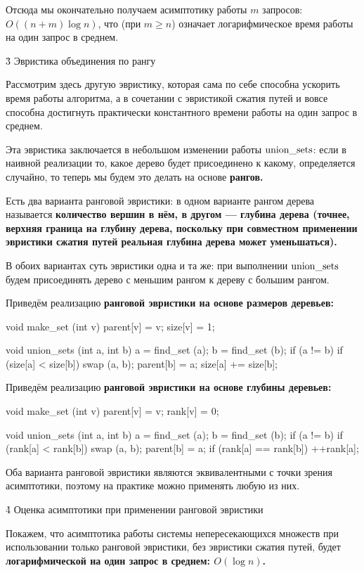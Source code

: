 Отсюда мы окончательно получаем асимптотику работы $m$ запросов: $O((n+m) \log n)$, что (при $m \ge n$) означает логарифмическое время работы на один запрос в среднем.



\h3{ Эвристика объединения по рангу }

Рассмотрим здесь другую эвристику, которая сама по себе способна ускорить время работы алгоритма, а в сочетании с эвристикой сжатия путей и вовсе способна достигнуть практически константного времени работы на один запрос в среднем.

Эта эвристика заключается в небольшом изменении работы ${\rm union\_sets}$: если в наивной реализации то, какое дерево будет присоединено к какому, определяется случайно, то теперь мы будем это делать на основе \bf{рангов}.

Есть два варианта ранговой эвристики: в одном варианте рангом дерева называется \bf{количество вершин} в нём, в другом --- \bf{глубина дерева} (точнее, верхняя граница на глубину дерева, поскольку при совместном применении эвристики сжатия путей реальная глубина дерева может уменьшаться).

В обоих вариантах суть эвристики одна и та же: при выполнении $\rm union\_sets$ будем присоединять дерево с меньшим рангом к дереву с большим рангом.

Приведём реализацию \bf{ранговой эвристики на основе размеров деревьев}:

\code
void make_set (int v) {
	parent[v] = v;
	size[v] = 1;
}

void union_sets (int a, int b) {
	a = find_set (a);
	b = find_set (b);
	if (a != b) {
		if (size[a] < size[b])
			swap (a, b);
		parent[b] = a;
		size[a] += size[b];
	}
}
\endcode

Приведём реализацию \bf{ранговой эвристики на основе глубины деревьев}:

\code
void make_set (int v) {
	parent[v] = v;
	rank[v] = 0;
}

void union_sets (int a, int b) {
	a = find_set (a);
	b = find_set (b);
	if (a != b) {
		if (rank[a] < rank[b])
			swap (a, b);
		parent[b] = a;
		if (rank[a] == rank[b])
			++rank[a];
	}
}
\endcode

Оба варианта ранговой эвристики являются эквивалентными с точки зрения асимптотики, поэтому на практике можно применять любую из них.


\h4{ Оценка асимптотики при применении ранговой эвристики }

Покажем, что асимптотика работы системы непересекающихся множеств при использовании только ранговой эвристики, без эвристики сжатия путей, будет \bf{логарифмической} на один запрос в среднем: $O (\log n)$.


